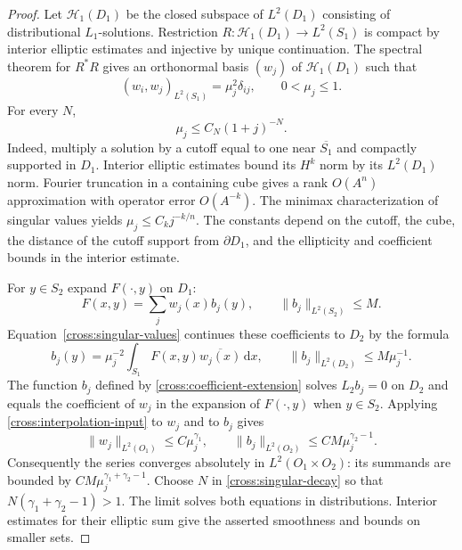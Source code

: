 \documentclass[11pt,a4paper]{article}
\theoremstyle{definition}
\theoremstyle{remark}
\newcommand{\dd}{\mathrm d}
\numberwithin{equation}{section}
\begin{document}
\begin{proof}
Let $\mathcal H_1(D_1)$ be the closed subspace of $L^2(D_1)$ consisting
of distributional $L_1$-solutions.  Restriction
$R:\mathcal H_1(D_1)\to L^2(S_1)$ is compact by interior elliptic
estimates and injective by unique continuation.  The spectral theorem
for $R^*R$ gives an orthonormal basis $(w_j)$ of
$\mathcal H_1(D_1)$ such that
\begin{equation}\label{cross:singular-values}
 (w_i,w_j)_{L^2(S_1)}=\mu_j^2\delta_{ij},
 \qquad 0<\mu_j\le1.
\end{equation}
For every $N$,
\begin{equation}\label{cross:singular-decay}
 \mu_j\le C_N(1+j)^{-N}.
\end{equation}
Indeed, multiply a solution by a cutoff equal to one near
$\overline{S_1}$ and compactly supported in $D_1$. Interior elliptic
estimates bound its $H^k$ norm by its $L^2(D_1)$ norm. Fourier
truncation in a containing cube gives a rank $O(A^n)$ approximation
with operator error $O(A^{-k})$. The minimax characterization of
singular values yields $\mu_j\le C_kj^{-k/n}$.
The constants depend on the cutoff, the cube, the distance of the
cutoff support from $\partial D_1$, and the ellipticity and coefficient
bounds in the interior estimate.

For $y\in S_2$ expand $F(\cdot,y)$ on $D_1$:
\[
 F(x,y)=\sum_j w_j(x)b_j(y),\qquad
 \|b_j\|_{L^2(S_2)}\le M.
\]
Equation~\eqref{cross:singular-values} continues these coefficients to
$D_2$ by the formula
\begin{equation}\label{cross:coefficient-extension}
 b_j(y)=\mu_j^{-2}\int_{S_1}F(x,y)\overline{w_j(x)}\,\dd x,
 \qquad \|b_j\|_{L^2(D_2)}\le M\mu_j^{-1}.
\end{equation}
The function $b_j$ defined by
\eqref{cross:coefficient-extension} solves $L_2b_j=0$ on $D_2$ and
equals the coefficient of $w_j$ in the expansion of $F(\cdot,y)$
when $y\in S_2$. Applying \eqref{cross:interpolation-input}
to $w_j$ and to $b_j$ gives
\[
 \|w_j\|_{L^2(O_1)}\le C\mu_j^{\gamma_1},\qquad
 \|b_j\|_{L^2(O_2)}\le CM\mu_j^{\gamma_2-1}.
\]
Consequently the series converges absolutely in $L^2(O_1\times O_2)$:
its summands are bounded by $CM\mu_j^{\gamma_1+\gamma_2-1}$.
Choose $N$ in \eqref{cross:singular-decay} so that
$N(\gamma_1+\gamma_2-1)>1$.  The limit solves both equations
in distributions.  Interior estimates for their elliptic sum give
the asserted smoothness and bounds on smaller sets.


\end{proof}
\end{document}
